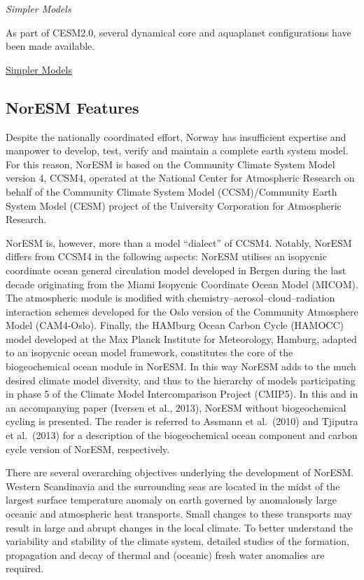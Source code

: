 \documentclass[
]{book}
\begin{document}
\emph{Simpler Models}

As part of CESM2.0, several dynamical core and aquaplanet configurations have been made available.

\href{https://www.cesm.ucar.edu/models/simpler-models/}{Simpler Models}

\hypertarget{noresm-features}{%
\subsection{NorESM Features}\label{noresm-features}}

Despite the nationally coordinated effort, Norway has
insufficient expertise and manpower to develop, test, verify
and maintain a complete earth system model. For this reason,
NorESM is based on the Community Climate System Model version 4,
CCSM4, operated at the National Center for
Atmospheric Research on behalf of the Community Climate
System Model (CCSM)/Community Earth System Model
(CESM) project of the University Corporation for
Atmospheric Research.

NorESM is, however, more than a model
``dialect'' of CCSM4. Notably, NorESM differs from CCSM4
in the following aspects: NorESM utilises an isopycnic
coordinate ocean general circulation model developed in
Bergen during the last decade originating from the Miami Isopycnic Coordinate
Ocean Model (MICOM). The atmospheric module is modified with
chemistry--aerosol--cloud--radiation interaction schemes developed for the Oslo
version of the Community Atmosphere Model (CAM4-Oslo).
Finally, the HAMburg Ocean Carbon Cycle (HAMOCC) model developed at the Max Planck
Institute for Meteorology, Hamburg, adapted to an isopycnic ocean
model framework, constitutes the core of
the biogeochemical ocean module in NorESM.
In this way NorESM adds to the much desired climate model diversity,
and thus to the hierarchy of models participating in phase
5 of the Climate Model Intercomparison Project (CMIP5).
In this and in an accompanying paper (Iversen et al., 2013), NorESM without
biogeochemical cycling is presented.
The reader is referred to Assmann et al.~(2010) and Tjiputra et al.~(2013)
for a description of the biogeochemical ocean component and carbon
cycle version of NorESM, respectively.

There are several overarching objectives underlying the
development of NorESM. Western Scandinavia and the surrounding
seas are located in the midst of the largest surface
temperature anomaly on earth governed
by anomalously large oceanic and atmospheric heat
transports.
Small changes to these transports may result in large and abrupt changes in the local climate.
To better understand the variability and stability of the climate system,
detailed studies of the formation, propagation
and decay of thermal and (oceanic) fresh water anomalies are required.
\end{document}
